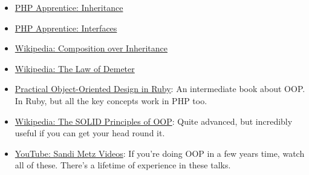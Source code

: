 \begin{itemize}[leftmargin=*]
    \item \href{https://phpapprentice.com/classes-inheritance.html}{PHP Apprentice: Inheritance}
    \item \href{https://phpapprentice.com/interfaces.html}{PHP Apprentice: Interfaces}
    \item \href{https://en.wikipedia.org/wiki/Composition\_over\_inheritance}{Wikipedia: Composition over Inheritance}
    \item \href{https://en.wikipedia.org/wiki/Law\_of\_Demeter}{Wikipedia: The Law of Demeter}
    \item \href{https://www.poodr.com}{Practical Object-Oriented Design in Ruby}: An intermediate book about OOP. In Ruby, but all the key concepts work in PHP too.
    \item \href{https://en.wikipedia.org/wiki/SOLID}{Wikipedia: The SOLID Principles of OOP}: Quite advanced, but incredibly useful if you can get your head round it.
    \item \href{https://www.youtube.com/channel/UCk3yOoaVtORwXipuLZ3jWNg}{YouTube: Sandi Metz Videos}: If you're doing OOP in a few years time, watch all of these. There's a lifetime of experience in these talks.
\end{itemize}
